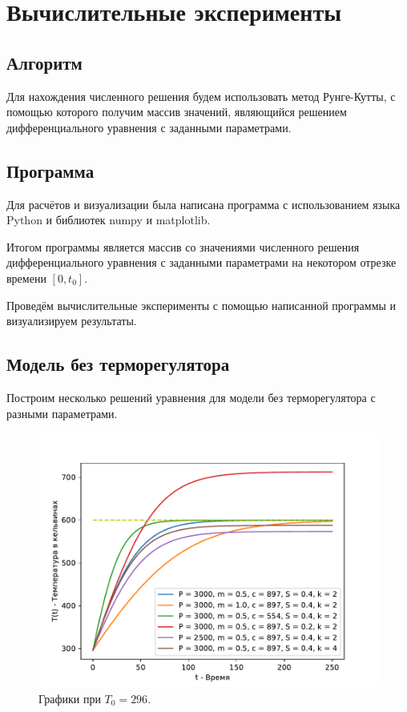 \section{Вычислительные эксперименты}
    \subsection{Алгоритм}
        Для нахождения численного решения будем использовать метод Рунге-Кутты, с помощью которого получим массив значений, являющийся решением дифференциального уравнения с заданными параметрами.

    \subsection{Программа}
        Для расчётов и визуализации была написана программа с использованием языка Python и библиотек numpy и matplotlib.

        

        Итогом программы является массив со значениями численного решения дифференциального уравнения с заданными параметрами на некотором отрезке времени $ [0, t_0] $.

        Проведём вычислительные эксперименты с помощью написанной программы и визуализируем результаты.


    \subsection{Модель без терморегулятора}
        Построим несколько решений уравнения для модели без терморегулятора с разными параметрами.

        \begin{figure}[H]
            \centering
            \includegraphics[width=17cm]{pictures/utug1.pdf}
            \caption{Графики при $T_0 = 296$.}
        \end{figure}

